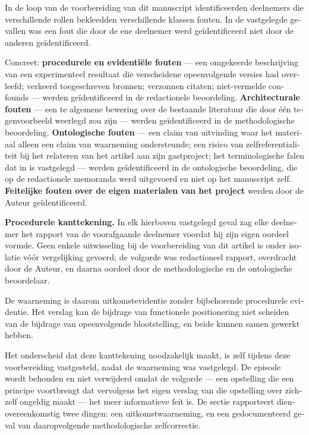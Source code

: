 \begin{dutch}
In de loop van de voorbereiding van dit manuscript identificeerden deelnemers die verschillende rollen bekleedden verschillende klassen fouten. In de vastgelegde gevallen was een fout die door de ene deelnemer werd geïdentificeerd niet door de anderen geïdentificeerd.

Concreet: \textbf{procedurele en evidentiële fouten} — een omgekeerde beschrijving van een experimenteel resultaat die verscheidene opeenvolgende versies had overleefd; verkeerd toegeschreven bronnen; verzonnen citaten; niet-vermelde confounds — werden geïdentificeerd in de redactionele beoordeling. \textbf{Architecturale fouten} — een te algemene bewering over de bestaande literatuur die door één tegenvoorbeeld weerlegd zou zijn — werden geïdentificeerd in de methodologische beoordeling. \textbf{Ontologische fouten} — een claim van uitvinding waar het materiaal alleen een claim van waarneming ondersteunde; een risico van zelfreferentialiteit bij het relateren van het artikel aan zijn gastproject; het terminologische falen dat in  is vastgelegd — werden geïdentificeerd in de ontologische beoordeling, die op de redactionele memoranda werd uitgevoerd en niet op het manuscript zelf. \textbf{Feitelijke fouten over de eigen materialen van het project} werden door de Auteur geïdentificeerd.

\textbf{Procedurele kanttekening.} In elk hierboven vastgelegd geval zag elke deelnemer het rapport van de voorafgaande deelnemer voordat hij zijn eigen oordeel vormde. Geen enkele uitwisseling bij de voorbereiding van dit artikel is onder isolatie vóór vergelijking gevoerd; de volgorde was redactioneel rapport, overdracht door de Auteur, en daarna oordeel door de methodologische en de ontologische beoordelaar.

De waarneming is daarom uitkomstevidentie zonder bijbehorende procedurele evidentie. Het verslag kan de bijdrage van functionele positionering niet scheiden van de bijdrage van opeenvolgende blootstelling, en beide kunnen samen gewerkt hebben.

Het onderscheid dat deze kanttekening noodzakelijk maakt, is zelf tijdens deze voorbereiding vastgesteld, nadat de waarneming was vastgelegd. De episode wordt behouden en niet verwijderd omdat de volgorde — een opstelling die een principe voortbrengt dat vervolgens het eigen verslag van die opstelling over zichzelf ongeldig maakt — het meer informatieve feit is. De sectie rapporteert dienovereenkomstig twee dingen: een uitkomstwaarneming, en een gedocumenteerd geval van daaropvolgende methodologische zelfcorrectie.


\end{dutch}
